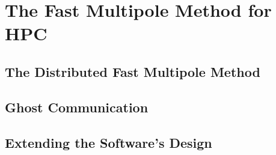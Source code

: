 \chapter{The Fast Multipole Method for HPC}\label{chpt:hpc}
\thispagestyle{chaptertitle} %

\section{The Distributed Fast Multipole Method}


\section{Ghost Communication}


\section{Extending the Software's Design}




